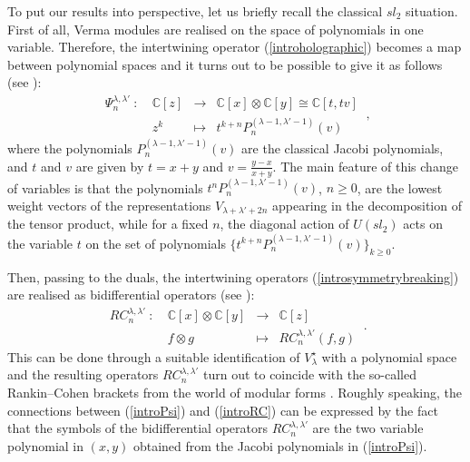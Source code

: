 \documentclass[a4paper,12pt]{article}
\numberwithin{equation}{section}
\newcommand{\C}{\mathbb{C}}
\theoremstyle{rem}
\theoremstyle{definition}
\begin{document}
To put our results into perspective, let us briefly recall the classical $sl_2$ situation. First of all, Verma modules are realised on the space of polynomials in one variable. Therefore, the intertwining operator (\ref{introholographic}) becomes a map between polynomial spaces and it turns out to be possible to give it as follows (see \cite{LabrietPoulain23}):
\begin{equation}\label{introPsi}
\begin{array}{lrcl}\Psi^{\lambda,\lambda'}_n\ :\ & \C[z] & \to & \C[x]\otimes \C[y]\cong \C[t,tv] \\[0.5em]
 & z^k & \mapsto & t^{k+n}P_n^{(\lambda-1,\lambda'-1)}(v)\end{array}\ , \end{equation}
where the polynomials $P_n^{(\lambda-1,\lambda'-1)}(v)$ are the classical Jacobi polynomials, and $t$ and $v$ are given by $t=x+y$ and $v=\frac{y-x}{x+y}$. The main feature of this change of variables is that the polynomials $t^nP_n^{(\lambda-1,\lambda'-1)}(v)$, $n\geq0$, are the lowest weight vectors of the representations $V_{\lambda+\lambda'+2n}$ appearing in the decomposition of the tensor product, while for a fixed $n$, the diagonal action of $U(sl_2)$ acts on the variable $t$ on the set of polynomials $\{t^{k+n}P_n^{(\lambda-1,\lambda'-1)}(v)\}_{k\geq0}$.

Then, passing to the duals, the intertwining operators (\ref{introsymmetrybreaking}) are realised as bidifferential operators (see \cite{LabrietPoulain24}):
\begin{equation}\label{introRC}
\begin{array}{lrcl}RC^{\lambda,\lambda'}_n\ :\ & \C[x]\otimes \C[y] & \to & \C[z] \\[0.5em]
 & f\otimes g & \mapsto & RC^{\lambda,\lambda'}_n(f,g)\end{array}\ .\end{equation}
This can be done through a suitable identification of $V_{\lambda}^{\star}$ with a polynomial space and the resulting operators $RC^{\lambda,\lambda'}_n$ turn out to coincide with the so-called Rankin--Cohen brackets from the world of modular forms \cite{Cohen75}. Roughly speaking, the connections between (\ref{introPsi}) and (\ref{introRC}) can be expressed by the fact that the symbols of the bidifferential operators $RC^{\lambda,\lambda'}_n$ are the two variable polynomial in $(x,y)$ obtained from the Jacobi polynomials in (\ref{introPsi}).
\end{document}
